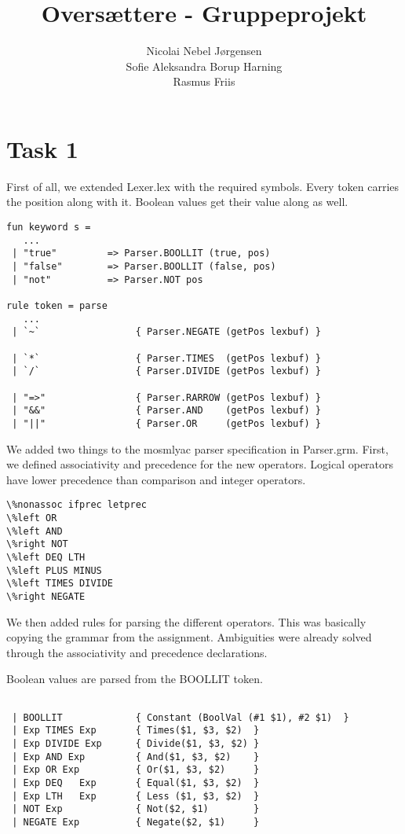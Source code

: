 \documentclass[10pt]{article}
\begin{document}
\title{Oversættere - Gruppeprojekt}
\author{Nicolai Nebel Jørgensen\\
Sofie Aleksandra Borup Harning\\
Rasmus Friis}

\maketitle
\newpage
\section{Task 1}

First of all, we extended Lexer.lex with the required symbols. Every token carries the position along with it. Boolean values get their value along as well.

\begin{Verbatim}[frame=single]
fun keyword s =
   ...
 | "true"         => Parser.BOOLLIT (true, pos)
 | "false"        => Parser.BOOLLIT (false, pos)
 | "not"          => Parser.NOT pos

rule token = parse
   ...
 | `~`                 { Parser.NEGATE (getPos lexbuf) }

 | `*`                 { Parser.TIMES  (getPos lexbuf) }
 | `/`                 { Parser.DIVIDE (getPos lexbuf) }

 | "=>"                { Parser.RARROW (getPos lexbuf) }
 | "&&"                { Parser.AND    (getPos lexbuf) }
 | "||"                { Parser.OR     (getPos lexbuf) }
\end{Verbatim}

We added two things to the mosmlyac parser specification in Parser.grm. First, we defined associativity and precedence for the new operators. Logical operators have lower precedence than comparison and integer operators.

\begin{Verbatim}[frame=single]
\%nonassoc ifprec letprec
\%left OR
\%left AND
\%right NOT
\%left DEQ LTH
\%left PLUS MINUS
\%left TIMES DIVIDE
\%right NEGATE
\end{Verbatim}

We then added rules for parsing the different operators. This was basically copying the grammar from the assignment. Ambiguities were already solved through the associativity and precedence declarations.

Boolean values are parsed from the BOOLLIT token.

\begin{Verbatim}[frame=single]

 | BOOLLIT             { Constant (BoolVal (#1 $1), #2 $1)  }
 | Exp TIMES Exp       { Times($1, $3, $2)  }
 | Exp DIVIDE Exp      { Divide($1, $3, $2) }
 | Exp AND Exp         { And($1, $3, $2)    }
 | Exp OR Exp          { Or($1, $3, $2)     }
 | Exp DEQ   Exp       { Equal($1, $3, $2)  }
 | Exp LTH   Exp       { Less ($1, $3, $2)  }
 | NOT Exp             { Not($2, $1)        }
 | NEGATE Exp          { Negate($2, $1)     }
\end{Verbatim}
\end{document}

